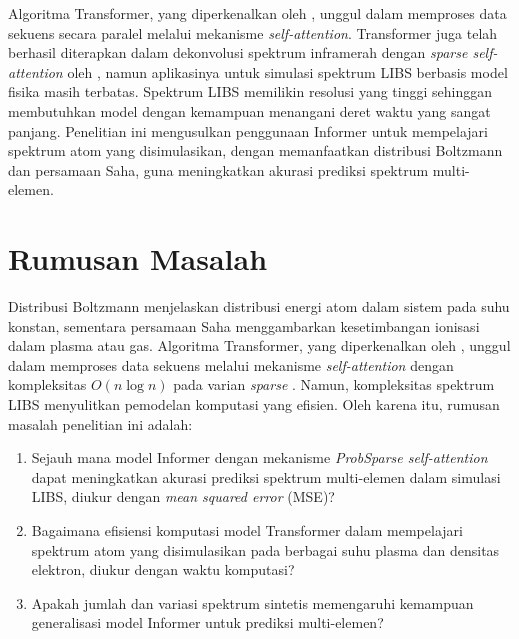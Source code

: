 \par Algoritma Transformer, yang diperkenalkan oleh \cite{Vaswani2017}, unggul dalam memproses data sekuens secara paralel melalui mekanisme \textit{self-attention}. Transformer juga telah berhasil diterapkan dalam dekonvolusi spektrum inframerah dengan \textit{sparse self-attention} oleh \cite{Gao2024}, namun aplikasinya untuk simulasi spektrum LIBS berbasis model fisika masih terbatas. Spektrum LIBS memilikin resolusi yang tinggi sehinggan membutuhkan model dengan kemampuan menangani deret waktu yang sangat panjang. Penelitian ini mengusulkan penggunaan Informer untuk mempelajari spektrum atom yang disimulasikan, dengan memanfaatkan distribusi Boltzmann dan persamaan Saha, guna meningkatkan akurasi prediksi spektrum multi-elemen.


\section{Rumusan Masalah}
\par Distribusi Boltzmann menjelaskan distribusi energi atom dalam sistem pada suhu konstan, sementara persamaan Saha menggambarkan kesetimbangan ionisasi dalam plasma atau gas. Algoritma Transformer, yang diperkenalkan oleh \cite{Vaswani2017}, unggul dalam memproses data sekuens melalui mekanisme \textit{self-attention} dengan kompleksitas \( O(n \log n) \) pada varian \textit{sparse} \parencite{Gao2024}. Namun, kompleksitas spektrum LIBS menyulitkan pemodelan komputasi yang efisien. Oleh karena itu, rumusan masalah penelitian ini adalah:
\begin{enumerate}
    \item Sejauh mana model Informer dengan mekanisme \textit{ProbSparse self-attention} dapat meningkatkan akurasi prediksi spektrum multi-elemen  dalam simulasi LIBS, diukur dengan \textit{mean squared error} (MSE)?
    \item Bagaimana efisiensi komputasi model Transformer dalam mempelajari spektrum atom yang disimulasikan pada berbagai suhu plasma dan densitas elektron, diukur dengan waktu komputasi?
    \item Apakah jumlah dan variasi spektrum sintetis memengaruhi kemampuan generalisasi model Informer untuk prediksi multi-elemen?
\end{enumerate}


